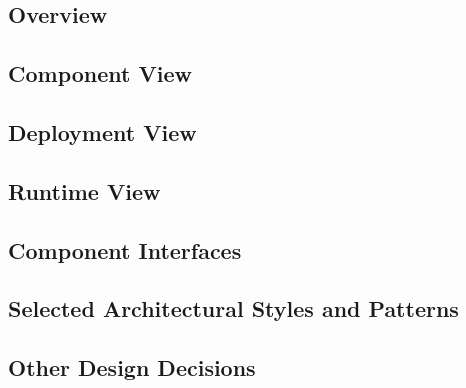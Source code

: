 \subsection{Overview}
\subsection{Component View}
\subsection{Deployment View}
\subsection{Runtime View}
\subsection{Component Interfaces}
\subsection{Selected Architectural Styles and Patterns}
\subsection{Other Design Decisions}